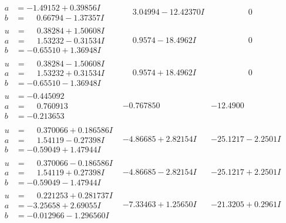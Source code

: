 \documentclass[1p]{elsarticle_modified}
\theoremstyle{definition}
\begin{document}
$$\begin{array}{c|c|c}
\begin{aligned}
a &= -1.49152 + 0.39856 I \\
b &= \phantom{-}0.66794 - 1.37357 I\end{aligned}
 & \phantom{-}3.04994 - 12.42370 I & \phantom{-0.000000 } 0 \\ \hline\begin{aligned}
u &= \phantom{-}0.38284 + 1.50608 I \\
a &= \phantom{-}1.53232 - 0.31534 I \\
b &= -0.65510 + 1.36948 I\end{aligned}
 & \phantom{-}0.9574 - 18.4962 I & \phantom{-0.000000 } 0 \\ \hline\begin{aligned}
u &= \phantom{-}0.38284 - 1.50608 I \\
a &= \phantom{-}1.53232 + 0.31534 I \\
b &= -0.65510 - 1.36948 I\end{aligned}
 & \phantom{-}0.9574 + 18.4962 I & \phantom{-0.000000 } 0 \\ \hline\begin{aligned}
u &= -0.445092\phantom{ +0.000000I} \\
a &= \phantom{-}0.760913\phantom{ +0.000000I} \\
b &= -0.213653\phantom{ +0.000000I}\end{aligned}
 & -0.767850\phantom{ +0.000000I} & -12.4900\phantom{ +0.000000I} \\ \hline\begin{aligned}
u &= \phantom{-}0.370066 + 0.186586 I \\
a &= \phantom{-}1.54119 - 0.27398 I \\
b &= -0.59049 + 1.47944 I\end{aligned}
 & -4.86685 + 2.82154 I & -25.1217 - 2.2501 I \\ \hline\begin{aligned}
u &= \phantom{-}0.370066 - 0.186586 I \\
a &= \phantom{-}1.54119 + 0.27398 I \\
b &= -0.59049 - 1.47944 I\end{aligned}
 & -4.86685 - 2.82154 I & -25.1217 + 2.2501 I \\ \hline\begin{aligned}
u &= \phantom{-}0.221253 + 0.281737 I \\
a &= -3.25658 + 2.69055 I \\
b &= -0.012966 - 1.296560 I\end{aligned}
 & -7.33463 + 1.25650 I & -21.3205 + 0.2961 I \\ \hline\begin{aligned}

\end{aligned}
\end{array}$$
\end{document}
